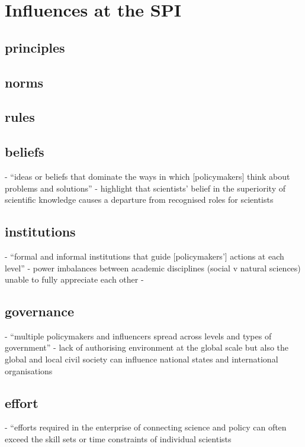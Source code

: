 \section{Influences at the SPI}

\subsection{principles}

\subsection{norms}

\subsection{rules}

\subsection{beliefs}
\cite{CairneyW2017} - ``ideas or beliefs that dominate the ways in which [policymakers] think about problems and solutions''
\cite{BalvaneraJNOBCDGGKKMPSSW2020} - highlight that scientists' belief in the superiority of scientific knowledge causes a departure from recognised roles for scientists

\subsection{institutions}
\cite{CairneyW2017} - ``formal and informal institutions that guide [policymakers'] actions at each level''
\cite{BalvaneraJNOBCDGGKKMPSSW2020} - power imbalances between academic disciplines (social v natural sciences) unable to fully appreciate each other
\cite{GeuijenMCRv2017} - 
\subsection{governance}
\cite{CairneyW2017} - ``multiple policymakers and influencers spread across levels and types of government''
\cite{GeuijenMCRv2017} - lack of authorising environment at the global scale but also the global and local civil society can influence national states and international organisations

\subsection{effort}
\cite{BednarekSHG2015} - ``efforts required in the enterprise of connecting science and policy can often exceed the skill sets or time constraints of individual scientists


